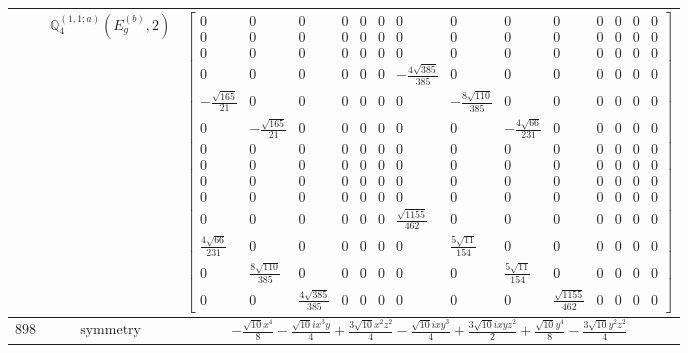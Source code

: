 \documentclass[fleqn,8pt,landscape]{jsarticle}
\begin{document}
\begin{longtable}{ccc}
$  $ & $ \mathbb{Q}_{4}^{(1,1;a)}(E_{g}^{(b)},2) $ & $ \begin{bmatrix} 0 & 0 & 0 & 0 & 0 & 0 & 0 & 0 & 0 & 0 & 0 & 0 & 0 & 0 \\ 0 & 0 & 0 & 0 & 0 & 0 & 0 & 0 & 0 & 0 & 0 & 0 & 0 & 0 \\ 0 & 0 & 0 & 0 & 0 & 0 & 0 & 0 & 0 & 0 & 0 & 0 & 0 & 0 \\ 0 & 0 & 0 & 0 & 0 & 0 & - \frac{4 \sqrt{385}}{385} & 0 & 0 & 0 & 0 & 0 & 0 & 0 \\ - \frac{\sqrt{165}}{21} & 0 & 0 & 0 & 0 & 0 & 0 & - \frac{8 \sqrt{110}}{385} & 0 & 0 & 0 & 0 & 0 & 0 \\ 0 & - \frac{\sqrt{165}}{21} & 0 & 0 & 0 & 0 & 0 & 0 & - \frac{4 \sqrt{66}}{231} & 0 & 0 & 0 & 0 & 0 \\ 0 & 0 & 0 & 0 & 0 & 0 & 0 & 0 & 0 & 0 & 0 & 0 & 0 & 0 \\ 0 & 0 & 0 & 0 & 0 & 0 & 0 & 0 & 0 & 0 & 0 & 0 & 0 & 0 \\ 0 & 0 & 0 & 0 & 0 & 0 & 0 & 0 & 0 & 0 & 0 & 0 & 0 & 0 \\ 0 & 0 & 0 & 0 & 0 & 0 & 0 & 0 & 0 & 0 & 0 & 0 & 0 & 0 \\ 0 & 0 & 0 & 0 & 0 & 0 & \frac{\sqrt{1155}}{462} & 0 & 0 & 0 & 0 & 0 & 0 & 0 \\ \frac{4 \sqrt{66}}{231} & 0 & 0 & 0 & 0 & 0 & 0 & \frac{5 \sqrt{11}}{154} & 0 & 0 & 0 & 0 & 0 & 0 \\ 0 & \frac{8 \sqrt{110}}{385} & 0 & 0 & 0 & 0 & 0 & 0 & \frac{5 \sqrt{11}}{154} & 0 & 0 & 0 & 0 & 0 \\ 0 & 0 & \frac{4 \sqrt{385}}{385} & 0 & 0 & 0 & 0 & 0 & 0 & \frac{\sqrt{1155}}{462} & 0 & 0 & 0 & 0 \end{bmatrix} $ \\ \hline
$ 898 $ & $ \text{symmetry} $ & $ - \frac{\sqrt{10} x^{4}}{8} - \frac{\sqrt{10} i x^{3} y}{4} + \frac{3 \sqrt{10} x^{2} z^{2}}{4} - \frac{\sqrt{10} i x y^{3}}{4} + \frac{3 \sqrt{10} i x y z^{2}}{2} + \frac{\sqrt{10} y^{4}}{8} - \frac{3 \sqrt{10} y^{2} z^{2}}{4} $ \\

\end{longtable}
\end{document}
